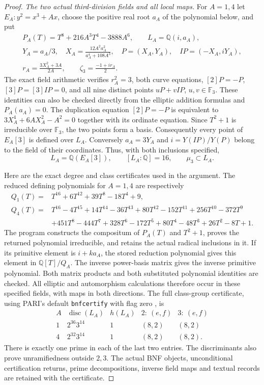 \begin{proof}
\emph{The two actual third-division fields and all local maps.}
For $A=1,4$ let $E_A:y^2=x^3+Ax$, choose the positive real root
$a_A$ of the polynomial below, and put
\[
 \begin{gathered}
 P_A(T)=T^8+216A^3T^4-3888A^6,
 \qquad L_A=\mathbb Q(i,a_A),\\
 Y_A=a_A/3,\quad
 X_A=\frac{12A^2a_A^2}{a_A^4+108A^3},\quad
 P=(X_A,Y_A),\quad IP=(-X_A,iY_A),\\
 r_A=\frac{3X_A^2+3A}{2A},\qquad
 \zeta_3=\frac{-1+ir_A}{2}.
 \end{gathered}
 \tag{E117.11}
\]
The exact field arithmetic verifies $r_A^2=3$, both curve
equations, $[2]P=-P$, $[3]P=[3]IP=0$, and all nine distinct
points $uP+vIP$, $u,v\in\mathbb F_3$.  These identities can
also be checked directly from the elliptic addition formulas
and $P_A(a_A)=0$.  The duplication equation $[2]P=-P$ is
equivalent to $3X_A^4+6AX_A^2-A^2=0$ together with its
ordinate equation.  Since $T^2+1$ is irreducible over
$\mathbb F_3$, the two points form a basis.  Consequently
every point of $E_A[3]$ is defined over $L_A$.  Conversely
$a_A=3Y_A$ and $i=Y(IP)/Y(P)$ belong to the field of their
coordinates.  Thus, with both inclusions specified,
\[
 L_A=\mathbb Q(E_A[3]),\qquad [L_A:\mathbb Q]=16,
 \qquad \mu_3\subset L_A.
 \tag{E117.12}
\]

Here are the exact degree and class certificates used in the
argument.  The reduced defining polynomials for $A=1,4$ are
respectively
\[
 \begin{split}
 Q_1(T)={}&T^{16}+6T^{12}+39T^8-18T^4+9,\\
 Q_4(T)={}&T^{16}-4T^{15}+14T^{14}-36T^{13}+80T^{12}
 -152T^{11}+256T^{10}-372T^9\\
 &+451T^8-444T^7+328T^6-172T^5+80T^4-48T^3
 +26T^2-8T+1.
 \end{split}
 \tag{E117.13}
\]
The program constructs the compositum of $P_A(T)$ and
$T^2+1$, proves the returned polynomial irreducible, and
retains the actual radical inclusions in it.  If its primitive
element is $i+k a_A$, the stored reduction polynomial gives
this element in $\mathbb Q[T]/Q_A$.  The inverse power-basis
matrix gives the inverse primitive polynomial.  Both matrix
products and both substituted polynomial identities are checked.
All elliptic and automorphism calculations therefore occur in
these specified fields, with maps in both directions.
The full class-group certificate, using PARI's default
\texttt{bnfcertify} with flag zero
\cite[General number fields, \texttt{bnfcertify}]{E117_PARI}, is
\[
 \begin{array}{c|c|c|c|c}
 A&\operatorname{disc}(L_A)&h(L_A)&2:\ (e,f)&3:\ (e,f)\\\hline
 1&2^{36}3^{14}&1&(8,2)&(8,2)\\
 4&2^{32}3^{14}&1&(8,2)&(8,2).
 \end{array}
 \tag{E117.14}
\]
There is exactly one prime in each of the last two entries.
The discriminants also prove unramifiedness outside $2,3$.
The actual BNF objects, unconditional certification returns,
prime decompositions, inverse field maps and textual records
are retained with the certificate.


\end{proof}
